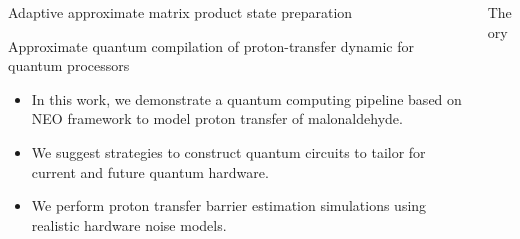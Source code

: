 \documentclass[final,hyperref={pdfpagelabels=false},mathserif]{beamer}
\begin{document}
\begin{columns}[t]
\begin{column}{40cm}
\begin{block}{Adaptive approximate matrix product state preparation}
\begin{itemize}[label=\textbullet, leftmargin=1em]
\end{itemize}

\end{block}

\begin{block}{Approximate quantum compilation of proton-transfer dynamic for quantum processors}
\vspace{-0.4em} %

\begin{tcolorbox}[colframe=blue!50!black, colback=blue!10!white]

\begin{itemize}[label=\textbullet, leftmargin=1em]

\item In this work, we demonstrate a quantum computing pipeline based on \gls{NEO} framework to model proton transfer of malonaldehyde. 

\item We suggest strategies to construct quantum circuits to tailor for current and future quantum hardware.

\item We perform proton transfer barrier estimation simulations using realistic hardware noise models.

\end{itemize}

\end{tcolorbox}
\vspace{-0.2em} %
\end{block}


\end{column}

\begin{column}{40cm}


\begin{block}{Theory}

\begin{itemize}[label=\textbullet, leftmargin=1em]


\end{itemize}
\end{block}
\end{column}
\end{columns}
\end{document}
